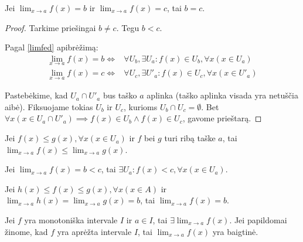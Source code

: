 \begin{prop}
  Jei $\lim_{x \to a} f(x) = b$ ir $\lim_{x \to a} f(x) = c$, tai $b = c$.
  \begin{proof}
    Tarkime priešingai $b \neq c$. Tegu $b < c$.

    Pagal \ref{limfed} apibrėžimą:
    \begin{align*}
      \lim_{x \to a} f(x) = b \iff&%
        \forall U_{b}, \exists U_{a} :%
        f(x) \in U_{b}, \forall x(x \in U_{a}) \\
      \lim_{x \to a} f(x) = c \iff&%
        \forall U_{c}, \exists U'_{a} :%
        f(x) \in U_{c}, \forall x(x \in U'_{a})
    \end{align*}

    Pastebėkime, kad $U_{a} \cap U'_{a}$ bus taško $a$ aplinka (taško 
    aplinka visada yra netuščia aibė).
    Fiksuojame tokias $U_{b}$ ir $U_{c}$, kurioms 
    $U_{b} \cap U_{c} = \emptyset$. Bet 
    $\forall x (x \in U_{a} \cap U'_{a}) \implies%
      f(x) \in U_{b} \land f(x) \in U_{c}$, gavome prieštarą.
  \end{proof}
\end{prop}

\begin{prop}
  Jei $f(x) \leq g(x), \forall x (x \in U_{a})$ ir $f$ bei $g$ turi ribą
  taške $a$, tai $\lim_{x \to a} f(x) \leq \lim_{x \to a} g(x)$.
\end{prop}

\begin{prop}
  Jei $\lim_{x \to a} f(x) = b < c$, tai 
  $\exists U_{a} : f(x) < c, \forall x (x \in U_{a})$.
\end{prop}

\begin{prop}
  Jei $h(x) \leq f(x) \leq g(x), \forall x(x \in A)$ ir 
  $\lim_{x \to a} h(x) = \lim_{x \to a} g(x) = b$, tai
  $\lim_{x \to a} f(x) = b$.
\end{prop}

\begin{prop}
  Jei $f$ yra monotoniška intervale $I$ ir $a \in I$, tai 
  $\exists \lim_{x \to a} f(x)$. Jei papildomai žinome, kad $f$ yra
  aprėžta intervale $I$, tai $\lim_{x \to a} f(x)$ yra baigtinė.
\end{prop}

